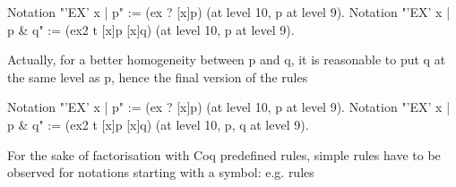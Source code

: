 \begin{coq_example*}
Notation "'EX' x | p"     := (ex ? [x]p) (at level 10, p at level 9).
Notation "'EX' x | p & q" := (ex2 t [x]p [x]q)
  (at level 10, p at level 9).
\end{coq_example*}

Actually, for a better homogeneity between p and q, it is reasonable
to put q at the same level as p, hence the final version of the rules

\begin{coq_example*}
Notation "'EX' x | p"     := (ex ? [x]p) (at level 10, p at level 9).
Notation "'EX' x | p & q" := (ex2 t [x]p [x]q)
  (at level 10, p, q at level 9).
\end{coq_example*}

For the sake of factorisation with Coq predefined rules, simple rules
have to be observed for notations starting with a symbol: e.g. rules
